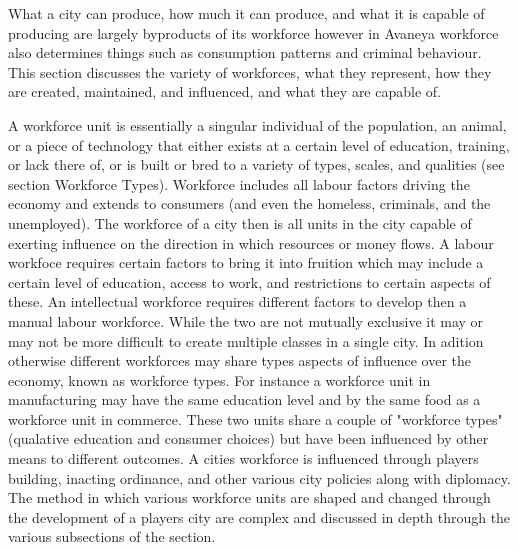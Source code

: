 

What a city can produce, how much it can produce, and what it is capable of producing are largely byproducts of its workforce however in Avaneya workforce also determines things such as consumption patterns and criminal behaviour. This section discusses the variety of workforces, what they represent, how they are created, maintained, and influenced, and what they are capable of. 

A workforce unit is essentially a singular individual of the population, an animal, or a piece of technology that either exists at a certain level of education, training, or lack there of, or is built or bred to a variety of types, scales, and qualities (see section Workforce Types). Workforce includes all labour factors driving the economy and extends to consumers (and even the homeless, criminals, and the unemployed). The workforce of a city then is all units in the city capable of exerting influence on the direction in which resources or money flows. A labour workfoce requires certain factors to bring it into fruition which may include a certain level of education, access to work, and restrictions to certain aspects of these. An intellectual workforce requires different factors to develop then a manual labour workforce. While the two are not mutually exclusive it may or may not be more difficult to create multiple classes in a single city. In adition otherwise different workforces may share types aspects of influence over the economy, known as workforce types. For instance a workforce unit in manufacturing may have the same education level and by the same food as a workforce unit in commerce. These two units share a couple of "workforce types" (qualative education and consumer choices) but have been influenced by other means to different outcomes. A cities workforce is influenced through players building, inacting ordinance, and other various city policies along with diplomacy. The method in which various workforce units are shaped and changed through the development of a players city are complex and discussed in depth through the various subsections of the section.

